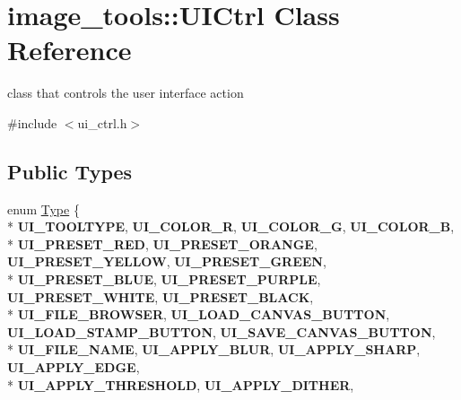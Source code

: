 \hypertarget{classimage__tools_1_1UICtrl}{}\section{image\+\_\+tools\+:\+:U\+I\+Ctrl Class Reference}
\label{classimage__tools_1_1UICtrl}


class that controls the user interface action  




{\ttfamily \#include $<$ui\+\_\+ctrl.\+h$>$}

\subsection*{Public Types}
\begin{DoxyCompactItemize}
\item 
enum \hyperlink{classimage__tools_1_1UICtrl_a94c1180d7f5541b2d52d0f56ff6dfbd6}{Type} \{ \\*
{\bfseries U\+I\+\_\+\+T\+O\+O\+L\+T\+Y\+PE}, 
{\bfseries U\+I\+\_\+\+C\+O\+L\+O\+R\+\_\+R}, 
{\bfseries U\+I\+\_\+\+C\+O\+L\+O\+R\+\_\+G}, 
{\bfseries U\+I\+\_\+\+C\+O\+L\+O\+R\+\_\+B}, 
\\*
{\bfseries U\+I\+\_\+\+P\+R\+E\+S\+E\+T\+\_\+\+R\+ED}, 
{\bfseries U\+I\+\_\+\+P\+R\+E\+S\+E\+T\+\_\+\+O\+R\+A\+N\+GE}, 
{\bfseries U\+I\+\_\+\+P\+R\+E\+S\+E\+T\+\_\+\+Y\+E\+L\+L\+OW}, 
{\bfseries U\+I\+\_\+\+P\+R\+E\+S\+E\+T\+\_\+\+G\+R\+E\+EN}, 
\\*
{\bfseries U\+I\+\_\+\+P\+R\+E\+S\+E\+T\+\_\+\+B\+L\+UE}, 
{\bfseries U\+I\+\_\+\+P\+R\+E\+S\+E\+T\+\_\+\+P\+U\+R\+P\+LE}, 
{\bfseries U\+I\+\_\+\+P\+R\+E\+S\+E\+T\+\_\+\+W\+H\+I\+TE}, 
{\bfseries U\+I\+\_\+\+P\+R\+E\+S\+E\+T\+\_\+\+B\+L\+A\+CK}, 
\\*
{\bfseries U\+I\+\_\+\+F\+I\+L\+E\+\_\+\+B\+R\+O\+W\+S\+ER}, 
{\bfseries U\+I\+\_\+\+L\+O\+A\+D\+\_\+\+C\+A\+N\+V\+A\+S\+\_\+\+B\+U\+T\+T\+ON}, 
{\bfseries U\+I\+\_\+\+L\+O\+A\+D\+\_\+\+S\+T\+A\+M\+P\+\_\+\+B\+U\+T\+T\+ON}, 
{\bfseries U\+I\+\_\+\+S\+A\+V\+E\+\_\+\+C\+A\+N\+V\+A\+S\+\_\+\+B\+U\+T\+T\+ON}, 
\\*
{\bfseries U\+I\+\_\+\+F\+I\+L\+E\+\_\+\+N\+A\+ME}, 
{\bfseries U\+I\+\_\+\+A\+P\+P\+L\+Y\+\_\+\+B\+L\+UR}, 
{\bfseries U\+I\+\_\+\+A\+P\+P\+L\+Y\+\_\+\+S\+H\+A\+RP}, 
{\bfseries U\+I\+\_\+\+A\+P\+P\+L\+Y\+\_\+\+E\+D\+GE}, 
\\*
{\bfseries U\+I\+\_\+\+A\+P\+P\+L\+Y\+\_\+\+T\+H\+R\+E\+S\+H\+O\+LD}, 
{\bfseries U\+I\+\_\+\+A\+P\+P\+L\+Y\+\_\+\+D\+I\+T\+H\+ER}, 

\end{DoxyCompactItemize}
